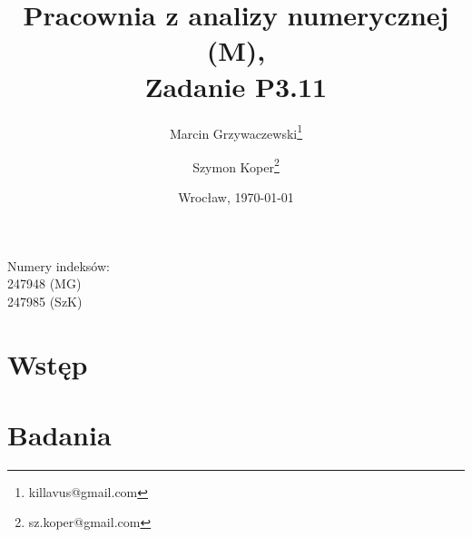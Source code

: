 \documentclass[wide, 11pt]{mwart}
\date{Wrocław, \today}
\title{Pracownia z analizy numerycznej (M),\\[8pt]\large{Zadanie P3.11}}
\author{Marcin Grzywaczewski\footnote{killavus@gmail.com} \and Szymon Koper\footnote{sz.koper@gmail.com}}
\begin{document}
	\maketitle
	\begin{center}
	Numery indeksów:\\247948 (MG)\\247985 (SzK)
	\end{center}
	\thispagestyle{empty}
	\newpage

	\section{Wstęp}

	\section{Badania}

\end{document}
